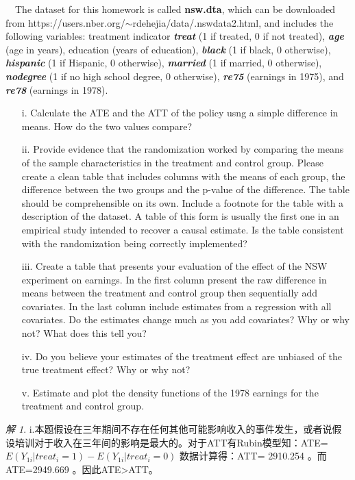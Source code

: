 \documentclass[a4paper]{ctexart}
\theoremstyle{remark}
\newtheorem*{solution}{解}
\begin{document}
\begin{itemize}
~~The dataset for this homework is called \textbf{nsw.dta}, which can be downloaded from https://users.nber.org/$\sim$rdehejia/data/.nswdata2.html,  and includes the following variables: treatment indicator \textit{\textbf{treat}} (1 if treated, 0 if not treated), \textit{\textbf{age}} (age in years), education (years of education), \textit{\textbf{black}} (1 if black, 0 otherwise), \textit{\textbf{hispanic}} (1 if Hispanic, 0 otherwise), \textit{\textbf{married}} (1 if married, 0 otherwise), \textit{\textbf{nodegree}} (1 if no high school degree, 0 otherwise), \textit{\textbf{re75}} (earnings in 1975), and \textit{\textbf{re78}} (earnings in 1978). 

\begin{enumerate}
\item[i.] Calculate the ATE and the ATT of the policy usng a simple difference in means. How do the two values compare?
\item[ii.] Provide evidence that the randomization worked by comparing the means of the sample characteristics in the treatment and control group. Please create a clean table that includes columns with the means of each group, the difference between the two groups and the p-value of the difference. The table should be comprehensible on its own. Include a footnote for the table with a description of the dataset. A table of this form is usually the first one in an empirical study intended to recover a causal estimate. Is the table consistent with the randomization being correctly implemented?
\item[iii.]  Create a table that presents your evaluation of the effect of the NSW experiment on earnings. In the first column present the raw difference in means between the treatment and control group then sequentially add covariates. In the last column include estimates from a regression with all covariates. Do the estimates change much as you add covariates? Why or why not? What does this tell you?
\item[iv.]  Do you believe your estimates of the treatment effect are unbiased of the true treatment effect? Why or why not?
\item[v.]  Estimate and plot the density functions of the 1978 earnings for the treatment and control group.
\end{enumerate}

\begin{solution}
    i.本题假设在三年期间不存在任何其他可能影响收入的事件发生，或者说假设培训对于收入在三年间的影响是最大的。对于ATT有Rubin模型知：ATE=$E(Y_{1i}|treat_i=1)-E(Y_{1i}|treat_i=0)$
    数据计算得：ATT=  2910.254 。而ATE=2949.669 。因此ATE>ATT。\\


\end{solution}
\end{itemize}
\end{document}
